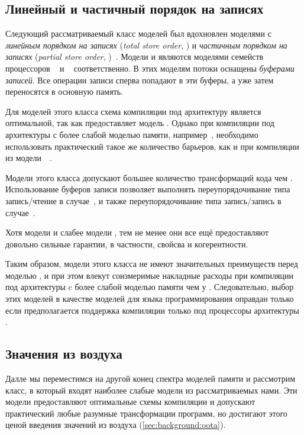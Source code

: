 \subsection{Линейный и частичный порядок на записях}
\label{sec:analysis:tso}

Следующий рассматриваемый класс моделей был вдохновлен моделями с 
\emph{линейным порядком на записях} (\emph{total store order}, \TSO)
и \emph{частичным порядком на записях} (\emph{partial store order}, \PSO)~\cite{Sparc:94}.
Модели \TSO и \PSO являются моделями семейств процессоров \Intel~\cite{Sewell-al:CACM10} 
и \SPARC~\cite{Sparc:94} соответственно. 
В этих моделям потоки оснащены \emph{буферами записей}.
Все операции записи сперва попадают в эти буферы, а уже 
затем переносятся в основную память. 

Для моделей этого класса схема компиляции под архитектуру \Intel 
является оптимальной, так как \Intel предоставляет модель \TSO.  
Однако при компиляции под архитектуры с более слабой моделью памяти, 
например~\POWER, необходимо использовать практический такое же 
количество барьеров, как и при компиляции из модели~\SC~\cite{Lustig-al:AISCA15}.

Модели этого класса допускают большее количество трансформаций кода чем \SC.
Использование буферов записи позволяет выполнять переупорядочивание 
типа запись/чтение в случае~\TSO, и также 
переупорядочивание типа запись/запись в случае~\PSO.

Хотя модели \TSO и \PSO слабее модели \SC, 
тем не менее они все ещё предоставляют довольно сильные гарантии, 
в частности, свойсва \DRF и когерентности.    

Таким образом, модели этого класса не имеют 
значительных преимуществ перед моделью \SC, 
и при этом влекут соизмеримые накладные расходы 
при компиляции под архитектуры c более слабой моделью памяти чем у \Intel. 
Следовательно, выбор этих моделей в качестве моделей для 
языка программирования оправдан только если предполагается 
поддержка компиляции только под процессоры архитектуры \Intel. 

\subsection{Значения из воздуха}
\label{sec:analysis:oota}

Далле мы переместимся на другой конец спектра моделей памяти
и рассмотрим класс, в который входят наиболее слабые модели
из рассматриваемых нами. 
Эти модели предоставляют оптимальные схемы компиляции и 
допускают практический любые разумные трансформации программ, 
но достигают этого ценой введения значений из воздуха 
(\cref{sec:background:oota}).

